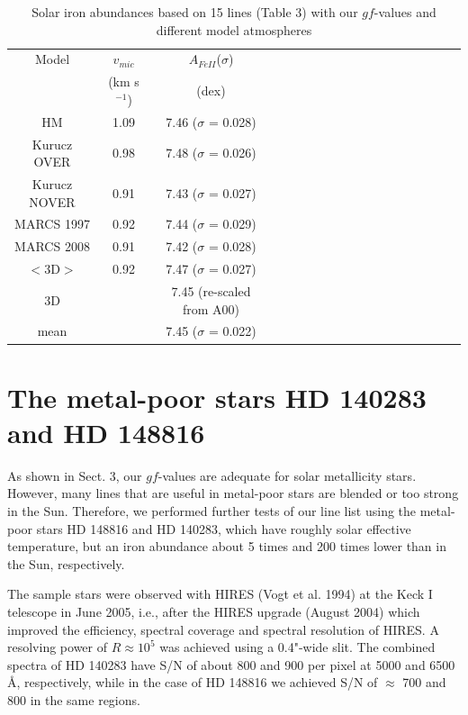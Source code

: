 \documentclass[traditabstract]{aa} %
\begin{document}
\begin{table}
\caption{Solar iron abundances based on 15  lines (Table 3) with our 
$gf$-values and different model atmospheres}
\label{sunfe2}
\centering 
\renewcommand{\footnoterule}{}  %
\begin{tabular}{cccccccccccccccccc} 
\hline\hline                
\scriptsize
{Model}  & $v_{mic}$           & $A_{FeII}$($\sigma$) \\
{     }  & (km s$^{-1}$) & (dex)  \\
\hline    
  HM         & 1.09 & 7.46 ($\sigma$ = 0.028)   \\
Kurucz OVER  & 0.98 & 7.48 ($\sigma$ = 0.026)   \\
Kurucz NOVER & 0.91 & 7.43 ($\sigma$ = 0.027)   \\
MARCS 1997   & 0.92 & 7.44 ($\sigma$ = 0.029)   \\
MARCS 2008   & 0.91 & 7.42 ($\sigma$ = 0.028)   \\
$<$3D$>$     & 0.92 & 7.47 ($\sigma$ = 0.027)   \\
  3D         &      & 7.45 (re-scaled from A00) \\
\hline                                 
 mean        &      & 7.45 ($\sigma$ = 0.022) \\
\hline                                 
\hline                                 
\end{tabular}
\end{table}


\section{The metal-poor stars HD 140283 and HD 148816}

As shown in Sect. 3, our $gf$-values are adequate for 
solar metallicity stars. However, many  lines that are
useful in metal-poor stars are blended or too strong in the Sun.
Therefore, we performed further tests of our line list using
the metal-poor stars HD 148816 and HD 140283,
which have roughly solar effective temperature, but an iron abundance 
about 5 times and 200 times lower than in the Sun, respectively.

The sample stars were observed with HIRES (Vogt et al. 1994) at the 
Keck I telescope in June 2005, i.e., after the HIRES upgrade (August 2004)
which improved the efficiency, spectral coverage and spectral resolution of HIRES. 
A resolving power of $R \approx 10^5$ was achieved using a
0.4"-wide slit. The combined spectra of HD 140283 have S/N of about 800 and 900 per pixel
at 5000 and 6500 \AA, respectively, while in the case of HD 148816 we achieved
S/N of $\approx$ 700 and 800 in the same regions. 
\end{document}
